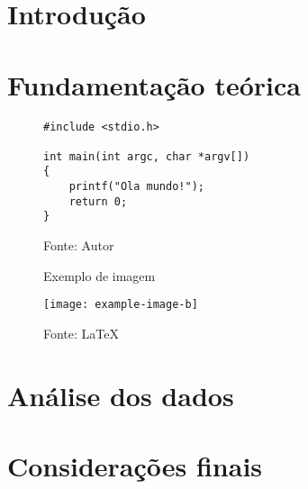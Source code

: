 
\tableofcontents

\pagebreak
\section{Introdução}
\lipsum

\pagebreak
\section{Fundamentação teórica}
\lipsum 

\begin{figure}[H]
\begin{lstlisting}[caption={Exemplo de código em C},captionpos=t]
#include <stdio.h>

int main(int argc, char *argv[])
{
    printf("Ola mundo!");
    return 0;
}
\end{lstlisting}
\caption*{Fonte: Autor}
\end{figure}
        
        
\lipsum

\begin{figure}[H]
    \centering
    \caption{Exemplo de imagem}
    \texttt{[image: example-image-b]}
    \caption*{Fonte: \LaTeX}
\end{figure}

\lipsum



\pagebreak
\section{Análise dos dados}
\lipsum

\pagebreak
\section{Considerações finais}
\lipsum

